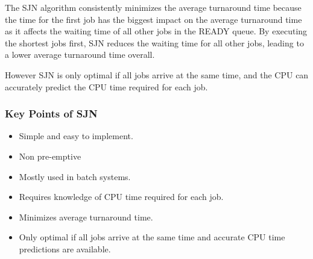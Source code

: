 \documentclass[12pt letter]{report}
\begin{document}

The SJN algorithm consistently minimizes the average turnaround time
because the time for the first job has the biggest impact on the
average turnaround time as it affects the waiting time of all other
jobs in the READY queue. By executing the shortest jobs first, SJN
reduces the waiting time for all other jobs, leading to a lower
average turnaround time overall.

However SJN is only optimal if all jobs arrive at the same time, and
the CPU can accurately predict the CPU time required for each job.

\subsubsection{Key Points of SJN}
\begin{itemize}
  \item Simple and easy to implement.
  \item Non pre-emptive
  \item Mostly used in batch systems.
  \item Requires knowledge of CPU time required for each job.
  \item Minimizes average turnaround time.
  \item Only optimal if all jobs arrive at the same time and accurate
    CPU time predictions are available.
\end{itemize}
\end{document}
